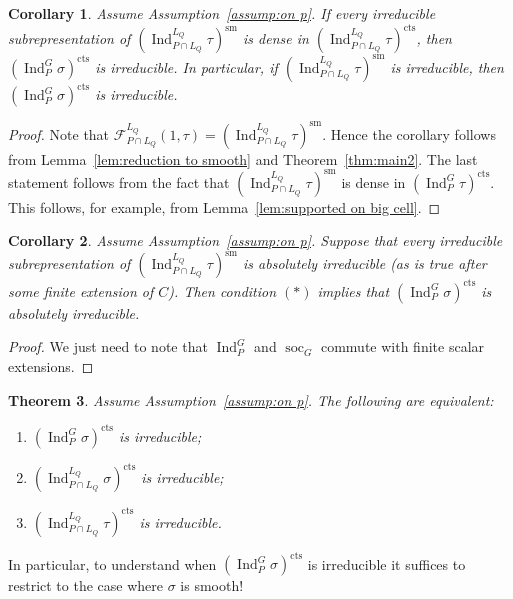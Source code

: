\documentclass[a4paper]{amsart}
\numberwithin{equation}{section}
\newtheorem{thm}{Theorem}[section]
\newtheorem{cor}[thm]{Corollary}
\theoremstyle{remark}
\theoremstyle{definition}
\DeclareMathOperator{\Ind}{Ind}
\DeclareMathOperator{\soc}{soc}
\newcommand{\sm}{\mathrm{sm}}
\newcommand{\cts}{\mathrm{cts}}
\begin{document}
\begin{cor}\label{cor:irreduciblity}
Assume Assumption~\ref{assump:on p}.
If every irreducible subrepresentation of $(\Ind_{P\cap L_{Q}}^{L_{Q}}\tau)^{\sm}$ is dense in $(\Ind_{P\cap L_{Q}}^{L_{Q}}\tau)^{\cts}$, then $(\Ind_{P}^{G}\sigma)^{\cts}$ is irreducible.
In particular, if $(\Ind_{P\cap L_{Q}}^{L_{Q}}\tau)^{\sm}$ is irreducible, then $(\Ind_{P}^{G}\sigma)^{\cts}$ is irreducible.
\end{cor}
\begin{proof}
Note that $\mathcal{F}_{P\cap L_{Q}}^{L_{Q}}(1,\tau) = (\Ind_{P\cap L_{Q}}^{L_{Q}}\tau)^{\sm}$.
Hence the corollary follows from Lemma~\ref{lem:reduction to smooth} and Theorem~\ref{thm:main2}.
The last statement follows from the fact that $(\Ind_{P\cap L_{Q}}^{L_{Q}}\tau)^{\sm}$ is dense in $(\Ind_{P}^{G}\tau)^{\cts}$.
This follows, for example, from Lemma~\ref{lem:supported on big cell}.
\end{proof}


\begin{cor}\label{cor:main2}
Assume Assumption~\ref{assump:on p}.
  Suppose that every irreducible subrepresentation of $(\Ind_{P \cap L_Q}^{L_Q} \tau)^{\sm}$ is absolutely irreducible (as is true after some finite extension of $C$).
  Then condition $(*)$ implies that $(\Ind_P^G \sigma)^\cts$ is absolutely irreducible.
\end{cor}

\begin{proof}
  We just need to note that $\Ind_P^G$ and $\soc_G$ commute with finite scalar extensions.
\end{proof}

\begin{thm}\label{thm:equivalence-irred}
Assume Assumption~\ref{assump:on p}.
  The following are equivalent:
  \begin{enumerate}
  \item $(\Ind_P^G \sigma)^\cts$ is irreducible;
  \item $(\Ind_{P\cap L_Q}^{L_Q} \sigma)^\cts$ is irreducible;
  \item $(\Ind_{P\cap L_Q}^{L_Q} \tau)^\cts$ is irreducible.
  \end{enumerate}
\end{thm}

In particular, to understand when $(\Ind_P^G \sigma)^\cts$ is irreducible
it suffices to restrict to the case where $\sigma$ is smooth!
\end{document}
